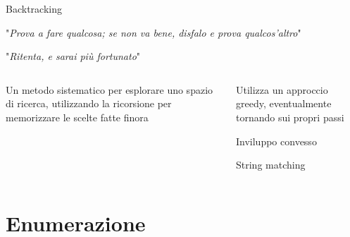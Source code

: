 \begin{frame}{Backtracking}

\vspace{-9pt}
\begin{myboxtitle}[Filosofia]
\smallskip
"\emph{Prova a fare qualcosa; se non va  bene, disfalo e prova qualcos'altro}"

\smallskip
"\emph{Ritenta, e sarai più fortunato}"
\end{myboxtitle}

\vspace{-14pt}
\begin{columns}
\begin{myboxtitle}[Ricorsione]
Un metodo \alert{sistematico} per esplorare uno spazio di ricerca, utilizzando la ricorsione per memorizzare le scelte fatte finora\\[-4pt]
\end{myboxtitle}
\begin{myboxtitle}[Iterazione]
Utilizza un approccio greedy, eventualmente tornando sui propri passi
\BI
\item \alert{Inviluppo convesso}
\item String matching
\EI
\end{myboxtitle}
\end{columns}


\end{frame}

\section{Enumerazione}

